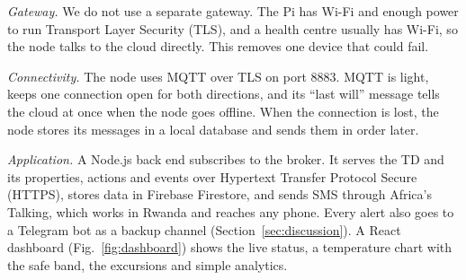 \documentclass[conference,12pt]{IEEEtran}
\begin{document}
\emph{Gateway.} We do not use a separate gateway. The Pi has Wi-Fi and enough power to run
Transport Layer Security (TLS), and a health centre usually has Wi-Fi, so the node talks to the
cloud directly. This removes one device that could fail.

\emph{Connectivity.} The node uses MQTT \cite{mqtt5} over TLS on port 8883. MQTT is light, keeps
one connection open for both directions, and its ``last will'' message tells the cloud at once
when the node goes offline. When the connection is lost, the node stores its messages in a local
database and sends them in order later.

\emph{Application.} A Node.js back end subscribes to the broker. It serves the TD and its
properties, actions and events over Hypertext Transfer Protocol Secure (HTTPS), stores data in
Firebase Firestore, and sends SMS through Africa's Talking, which works in Rwanda and reaches any
phone. Every alert also goes to a Telegram bot as a backup channel (Section~\ref{sec:discussion}).
A React dashboard (Fig.~\ref{fig:dashboard}) shows the live status, a temperature chart with the
safe band, the excursions and simple analytics.
\end{document}
